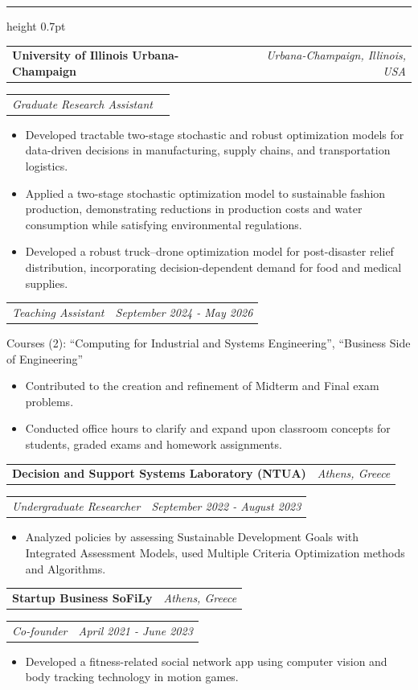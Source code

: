 \documentclass[11pt,a4paper]{article}
\makeatletter
\newcommand{\cvsection}[1]{\par\vspace{13pt}{\bfseries #1}\par\nobreak\hrule height 0.7pt\relax\vspace{2pt}}
\newcommand{\cvrow}[2]{\noindent\begin{tabularx}{\linewidth}{@{}Xr@{}}#1 & #2\end{tabularx}\par}
\newcommand{\entrygap}{\par\vspace{3pt}}
\makeatother
\begin{document}
\cvsection{EXPERIENCE}
\cvrow{\textbf{University of Illinois Urbana-Champaign}}{\textit{Urbana-Champaign, Illinois, USA}}
\cvrow{\textit{Graduate Research Assistant}}{}
\begin{itemize}
\item Developed tractable two-stage stochastic and robust optimization models for data-driven decisions in manufacturing, supply chains, and transportation logistics.
\item Applied a two-stage stochastic optimization model to sustainable fashion production, demonstrating reductions in production costs and water consumption while satisfying environmental regulations.
\item Developed a robust truck--drone optimization model for post-disaster relief distribution, incorporating decision-dependent demand for food and medical supplies.
\end{itemize}
\entrygap
\cvrow{\textit{Teaching Assistant}}{\textit{September 2024 - May 2026}}
Courses (2): ``Computing for Industrial and Systems Engineering'', ``Business Side of Engineering''
\begin{itemize}
\item Contributed to the creation and refinement of Midterm and Final exam problems.
\item Conducted office hours to clarify and expand upon classroom concepts for students, graded exams and homework assignments.
\end{itemize}
\entrygap
\cvrow{\textbf{Decision and Support Systems Laboratory (NTUA)}}{\textit{Athens, Greece}}
\cvrow{\textit{Undergraduate Researcher}}{\textit{September 2022 - August 2023}}
\begin{itemize}
\item Analyzed policies by assessing Sustainable Development Goals with Integrated Assessment Models, used Multiple Criteria Optimization methods and Algorithms.
\end{itemize}
\entrygap
\cvrow{\textbf{Startup Business SoFiLy}}{\textit{Athens, Greece}}
\cvrow{\textit{Co-founder}}{\textit{April 2021 - June 2023}}
\begin{itemize}
\item Developed a fitness-related social network app using computer vision and body tracking technology in motion games.
\end{itemize}
\end{document}
